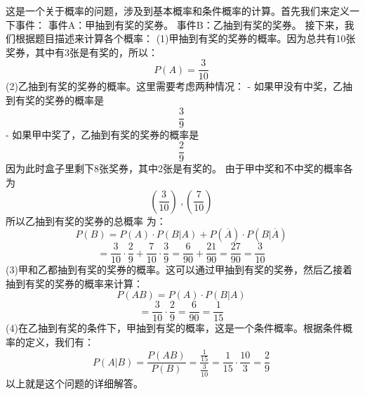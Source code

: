 
这是一个关于概率的问题，涉及到基本概率和条件概率的计算。首先我们来定义一下事件：  事件A：甲抽到有奖的奖券。 事件B：乙抽到有奖的奖券。 接下来，我们根据题目描述来计算各个概率： (1)甲抽到有奖的奖券的概率。因为总共有10张奖券，其中有3张是有奖的，所以： \begin{equation}
 P(A) = \frac{3}{10}  ~
\end{equation}(2)乙抽到有奖的奖券的概率。这里需要考虑两种情况： - 如果甲没有中奖，乙抽到有奖的奖券的概率是
\begin{equation}
 \frac{3}{9}~
\end{equation}
 - 如果甲中奖了，乙抽到有奖的奖券的概率是 \begin{equation}
 \frac{2}{9}~
 \end{equation}因为此时盒子里剩下8张奖券，其中2张是有奖的。 由于甲中奖和不中奖的概率各为 \begin{equation}
 ( \frac{3}{10} )~,(\frac{7}{10})~
 \end{equation}所以乙抽到有奖的奖券的总概率   为： \begin{equation}
  P(B) = P(A) \cdot P(B|A) + P(\overline{A}) \cdot P(B|\overline{A})~
 \end{equation}\begin{equation}
 = \frac{3}{10} \cdot \frac{2}{9} + \frac{7}{10} \cdot \frac{3}{9} = \frac{6}{90} + \frac{21}{90} = \frac{27}{90} = \frac{3}{10} ~
 \end{equation}(3)甲和乙都抽到有奖的奖券的概率。这可以通过甲抽到有奖的奖券，然后乙接着抽到有奖的奖券的概率来计算： \begin{equation}
  P(AB) = P(A) \cdot P(B|A) ~
 \end{equation}
 \begin{equation}
 = \frac{3}{10} \cdot \frac{2}{9} = \frac{6}{90} = \frac{1}{15} ~
 \end{equation}
 (4)在乙抽到有奖的条件下，甲抽到有奖的概率，这是一个条件概率。根据条件概率的定义，我们有： \begin{equation}
  P(A|B) = \frac{P(AB)}{P(B)}  = \frac{\frac{1}{15}}{\frac{3}{10}}= \frac{1}{15} \cdot \frac{10}{3} = \frac{2}{9}  ~
 \end{equation}
 以上就是这个问题的详细解答。

